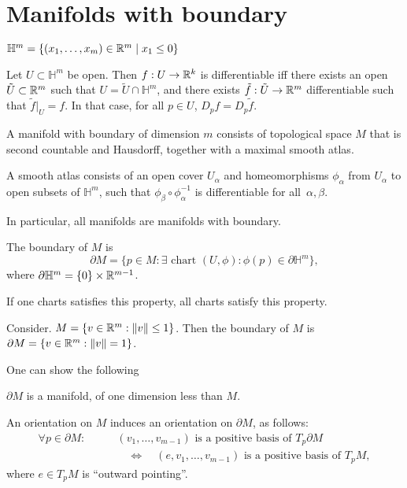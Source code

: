 \filbreak
\section{Manifolds with boundary}
\begin{definition}
    $\mathbb{H}^{m} = \{(x_1, \ldots, x_m) \in  \mathbb{R}^m  \mid  x_1 \le  0\} $
\end{definition}
\begin{definition}
    Let $U \subset \mathbb{H}^{m}$ be open.
    Then $f: U \to  \mathbb{R}^{k}$ is differentiable iff there exists an open $\tilde{U} \subset \mathbb{R}^m$ such that $U = \tilde{U} \cap \mathbb{H}^{m}$, and there exists $\tilde{f}: \tilde{U} \to  \mathbb{R}^{m}$ differentiable such that $\tilde{f}|_U = f$.
    In that case, for all $p \in U$, $D_pf = D_p \tilde{f}$.
\end{definition}

\begin{definition}
    A manifold with boundary of dimension $m$ consists of
    topological space $M$ that is second countable and Hausdorff, together with a maximal smooth atlas.
    
    A smooth atlas consists of an open cover $U_\alpha$ and homeomorphisms  
    $\phi_\alpha$ from $U_\alpha$ to open subsets of $\mathbb{H}^{m}$,
    such that $\phi_\beta  \circ  \phi_\alpha ^{-1}$ is differentiable for all~$\alpha,\beta$.
\end{definition}
\begin{remark}
    In particular, all manifolds are manifolds with boundary.
\end{remark}


\begin{definition}[Boundary]
    The boundary of $M$ is 
    \[
        \partial M = \{ p \in M: \exists \text{ chart }(U, \phi): \phi(p) \in \partial\mathbb{H}^{m}\} 
    ,\] 
    where $\partial \mathbb{H}^{m} = \{0\} \times \mathbb{R}^{m-1}$.
\end{definition}
\begin{remark}
    If one charts satisfies this property, all charts satisfy this property.
\end{remark}
\begin{eg}
    Consider. $M = \{v \in \mathbb{R}^m: \|v\| \le  1\}$.
Then the boundary of $M$ is $\partial M = \{v \in \mathbb{R}^{m} : \|v\| = 1\}$.
\end{eg}

One can show the following
\begin{prop}
    $\partial M$ is a manifold, of one dimension less than $M$.
\end{prop}
\begin{prop}
    An orientation on $M$ induces an orientation on $\partial M$, as follows:
    \begin{align*}
        \forall  p \in  \partial M: \qquad 
        &(v_1, \ldots, v_{m-1}) \text{ is a positive basis of $T_p \partial M$}\\
        &\quad \iff \quad 
        (e, v_1, \ldots, v_{m-1})\text{ is a positive basis of $T_pM$}
        ,
    \end{align*}
    where $e\in T_pM$ is ``outward pointing''.
\end{prop}

